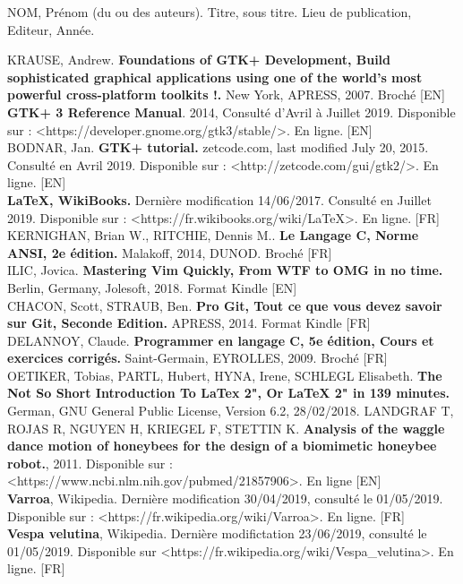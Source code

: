 \documentclass[11pt,french,a4paper]{report}
\begin{document}
NOM, Prénom (du ou des auteurs). Titre, sous titre. Lieu de publication, Editeur, Année. 

KRAUSE, Andrew. \textbf{Foundations of GTK+ Development, Build sophisticated graphical applications using one of the world's most powerful cross-platform toolkits !.} New York, APRESS, 2007. Broché [EN] \\
\textbf{GTK+ 3 Reference Manual}. 2014, Consulté d'Avril à Juillet 2019. Disponible sur : <https://developer.gnome.org/gtk3/stable/>. En ligne. [EN] \\
BODNAR, Jan. \textbf{GTK+ tutorial.} zetcode.com, last modified July 20, 2015. Consulté en Avril 2019. Disponible sur : <http://zetcode.com/gui/gtk2/>. En ligne. [EN] \\
\textbf{LaTeX, WikiBooks.} Dernière modification 14/06/2017. Consulté en Juillet 2019. Disponible sur : <https://fr.wikibooks.org/wiki/LaTeX>. En ligne. [FR] \\
KERNIGHAN, Brian W., RITCHIE, Dennis M.. \textbf{Le Langage C, Norme ANSI, 2e édition.} Malakoff, 2014, DUNOD. Broché [FR] \\
ILIC, Jovica. \textbf{Mastering Vim Quickly, From WTF to OMG in no time.} Berlin, Germany, Jolesoft, 2018. Format Kindle [EN] \\
CHACON, Scott, STRAUB, Ben. \textbf{Pro Git, Tout ce que vous devez savoir sur Git, Seconde Edition.} APRESS, 2014. Format Kindle [FR] \\
DELANNOY, Claude. \textbf{Programmer en langage C, 5e édition, Cours et exercices corrigés.} Saint-Germain, EYROLLES, 2009. Broché [FR] \\
OETIKER, Tobias, PARTL, Hubert, HYNA, Irene, SCHLEGL Elisabeth. \textbf{The Not So Short Introduction To LaTex 2", Or LaTeX 2" in 139 minutes.} German, GNU General Public License, Version 6.2, 28/02/2018.
LANDGRAF T, ROJAS R, NGUYEN H, KRIEGEL F, STETTIN K. \textbf{Analysis of the waggle dance motion of honeybees for the design of a biomimetic honeybee robot.}, 2011. Disponible sur : <https://www.ncbi.nlm.nih.gov/pubmed/21857906>. En ligne [EN] \\
\textbf{Varroa}, Wikipedia. Dernière modification 30/04/2019, consulté le 01/05/2019. Disponible sur : <https://fr.wikipedia.org/wiki/Varroa>. En ligne. [FR]\\
\textbf{Vespa velutina}, Wikipedia. Dernière modifictation 23/06/2019, consulté le 01/05/2019. Disponible sur <https://fr.wikipedia.org/wiki/Vespa\_velutina>. En ligne. [FR] \\
\end{document}

